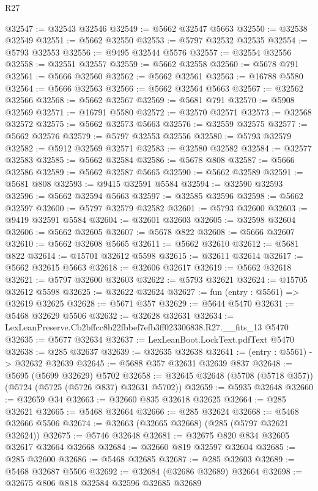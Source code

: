 \begin{lexlean}{R27}
\begin{coremodule}
@32547 := @32543 @32546
@32549 := @5662 @32547 @5663
@32550 := @32538 @32549
@32551 := @5662 @32550
@32553 := @5797 @32532 @32535
@32554 := @5793 @32553
@32556 := @9495 @32544 @5576
@32557 := @32554 @32556
@32558 := @32551 @32557
@32559 := @5662 @32558
@32560 := @5678 @791
@32561 := @5666 @32560
@32562 := @5662 @32561
@32563 := @16788 @5580
@32564 := @5666 @32563
@32566 := @5662 @32564 @5663
@32567 := @32562 @32566
@32568 := @5662 @32567
@32569 := @5681 @791
@32570 := @5908 @32569
@32571 := @16791 @5580
@32572 := @32570 @32571
@32573 := @32568 @32572
@32575 := @5662 @32573 @5663
@32576 := @32559 @32575
@32577 := @5662 @32576
@32579 := @5797 @32553 @32556
@32580 := @5793 @32579
@32582 := @5912 @32569 @32571
@32583 := @32580 @32582
@32584 := @32577 @32583
@32585 := @5662 @32584
@32586 := @5678 @808
@32587 := @5666 @32586
@32589 := @5662 @32587 @5665
@32590 := @5662 @32589
@32591 := @5681 @808
@32593 := @9415 @32591 @5584
@32594 := @32590 @32593
@32596 := @5662 @32594 @5663
@32597 := @32585 @32596
@32598 := @5662 @32597
@32600 := @5797 @32579 @32582
@32601 := @5793 @32600
@32603 := @9419 @32591 @5584
@32604 := @32601 @32603
@32605 := @32598 @32604
@32606 := @5662 @32605
@32607 := @5678 @822
@32608 := @5666 @32607
@32610 := @5662 @32608 @5665
@32611 := @5662 @32610
@32612 := @5681 @822
@32614 := @15701 @32612 @5598
@32615 := @32611 @32614
@32617 := @5662 @32615 @5663
@32618 := @32606 @32617
@32619 := @5662 @32618
@32621 := @5797 @32600 @32603
@32622 := @5793 @32621
@32624 := @15705 @32612 @5598
@32625 := @32622 @32624
@32627 := fun (entry : @5561) => @32619 @32625
@32628 := @5671 @357
@32629 := @5644 @5470
@32631 := @5468 @32629 @5506
@32632 := @32628 @32631
@32634 := LexLeanPreserve.Cb2bffcc8b22fbbef7efb3ff023306838.R27.__fits_13 @5470
@32635 := @5677 @32634
@32637 := LexLeanBoot.LockText.pdfText @5470
@32638 := @285 @32637
@32639 := @32635 @32638
@32641 := (entry : @5561) -> @32632 @32639
@32645 := @5688 @357 @32631 @32639 @837
@32648 := @5695 (@5699 @32629) @5702
@32658 := @32645 @32648 (@5708 (@5718 @357)) (@5724 (@5725 (@5726 @837) @32631 @5702))
@32659 := @5935 @32648
@32660 := @32659 @34
@32663 := @32660 @835 @32618 @32625
@32664 := @285 @32621
@32665 := @5468 @32664
@32666 := @285 @32624
@32668 := @5468 @32666 @5506
@32674 := @32663 (@32665 @32668) (@285 (@5797 @32621 @32624))
@32675 := @5746 @32648
@32681 := @32675 @820 @834 @32605 @32617 @32664 @32668
@32684 := @32660 @819 @32597 @32604
@32685 := @285 @32600
@32686 := @5468 @32685
@32687 := @285 @32603
@32689 := @5468 @32687 @5506
@32692 := @32684 (@32686 @32689) @32664
@32698 := @32675 @806 @818 @32584 @32596 @32685 @32689

\end{coremodule}
\end{lexlean}
